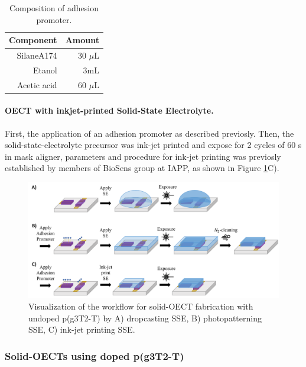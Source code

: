 \begin{table}[h]
	\centering
	\caption{Composition of adhesion promoter.}
	\begin{tabular}{r r} \hline
		Component   & Amount \\ \hline
		SilaneA174	& 30 $\mu$L \\ 
		Etanol   & 3mL \\ 
		Acetic acid   & 60 $\mu$L \\ \hline
	\end{tabular}
	\label{tab:adprom}
\end{table}

\paragraph{OECT with inkjet-printed Solid-State Electrolyte.}First, the application of an adhesion promoter as described previosly. Then, the solid-state-electrolyte precursor was ink-jet printed and expose for 2 cycles of 60 s in mask aligner, parameters and procedure for ink-jet printing was previosly established by members of BioSens group at IAPP, as shown in Figure \ref{fig:undopedsse}C). 

\begin{figure}[!ht]
	\centering
	\includegraphics[width=\textwidth]{Images/pdf/undoped-sse.pdf}
	\caption[Solid-OECT fabrication with undoped p(g3T2-T)]{Visualization of the workflow for solid-OECT fabrication with undoped p(g3T2-T) by A) dropcasting SSE, B) photopatterning SSE, C) ink-jet printing SSE.}
	\label{fig:undopedsse}
\end{figure}

\subsubsection{Solid-OECTs using doped p(g3T2-T)}

